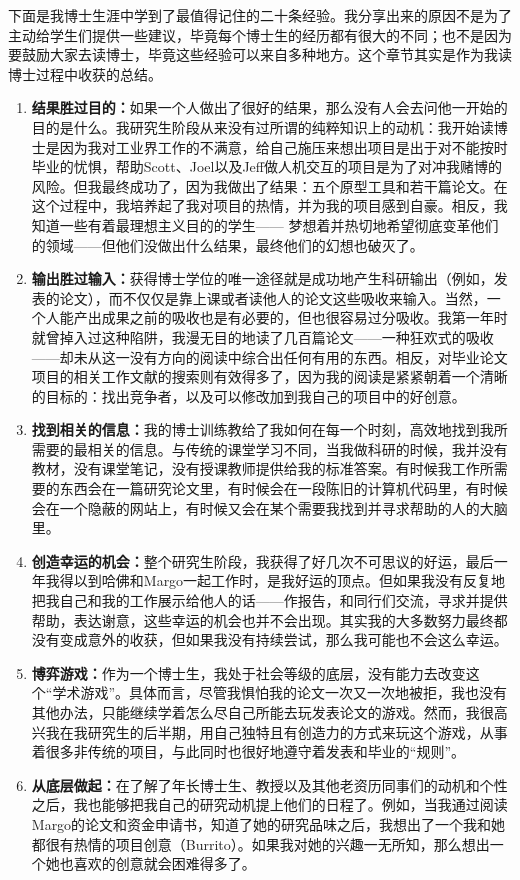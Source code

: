\documentclass[12pt,UTF8,nofonts]{book}
\begin{document}
下面是我博士生涯中学到了最值得记住的二十条经验。我分享出来的原因不是为了主动给学生们提供一些建议，毕竟每个博士生的经历都有很大的不同；也不是因为要鼓励大家去读博士，毕竟这些经验可以来自多种地方。这个章节其实是作为我读博士过程中收获的总结。
\begin{enumerate}
  \item \textbf{结果胜过目的：}如果一个人做出了很好的结果，那么没有人会去问他一开始的目的是什么。我研究生阶段从来没有过所谓的纯粹知识上的动机：我开始读博士是因为我对工业界工作的不满意，给自己施压来想出项目是出于对不能按时毕业的忧惧，帮助Scott、Joel以及Jeff做人机交互的项目是为了对冲我赌博的风险。但我最终成功了，因为我做出了结果：五个原型工具和若干篇论文。在这个过程中，我培养起了我对项目的热情，并为我的项目感到自豪。相反，我知道一些有着最理想主义目的的学生—— 梦想着并热切地希望彻底变革他们的领域——但他们没做出什么结果，最终他们的幻想也破灭了。
  \item \textbf{输出胜过输入：}获得博士学位的唯一途径就是成功地产生科研输出（例如，发表的论文），而不仅仅是靠上课或者读他人的论文这些吸收来输入。当然，一个人能产出成果之前的吸收也是有必要的，但也很容易过分吸收。我第一年时就曾掉入过这种陷阱，我漫无目的地读了几百篇论文——一种狂欢式的吸收——却未从这一没有方向的阅读中综合出任何有用的东西。相反，对毕业论文项目的相关工作文献的搜索则有效得多了，因为我的阅读是紧紧朝着一个清晰的目标的：找出竞争者，以及可以修改加到我自己的项目中的好创意。
  \item \textbf{找到相关的信息：}我的博士训练教给了我如何在每一个时刻，高效地找到我所需要的最相关的信息。与传统的课堂学习不同，当我做科研的时候，我并没有教材，没有课堂笔记，没有授课教师提供给我的标准答案。有时候我工作所需要的东西会在一篇研究论文里，有时候会在一段陈旧的计算机代码里，有时候会在一个隐蔽的网站上，有时候又会在某个需要我找到并寻求帮助的人的大脑里。
  \item \textbf{创造幸运的机会：}整个研究生阶段，我获得了好几次不可思议的好运，最后一年我得以到哈佛和Margo一起工作时，是我好运的顶点。但如果我没有反复地把我自己和我的工作展示给他人的话——作报告，和同行们交流，寻求并提供帮助，表达谢意，这些幸运的机会也并不会出现。其实我的大多数努力最终都没有变成意外的收获，但如果我没有持续尝试，那么我可能也不会这么幸运。
  \item \textbf{博弈游戏：}作为一个博士生，我处于社会等级的底层，没有能力去改变这个“学术游戏”。具体而言，尽管我惧怕我的论文一次又一次地被拒，我也没有其他办法，只能继续学着怎么尽自己所能去玩发表论文的游戏。然而，我很高兴我在我研究生的后半期，用自己独特且有创造力的方式来玩这个游戏，从事着很多非传统的项目，与此同时也很好地遵守着发表和毕业的“规则”。
  \item \textbf{从底层做起：}在了解了年长博士生、教授以及其他老资历同事们的动机和个性之后，我也能够把我自己的研究动机提上他们的日程了。例如，当我通过阅读Margo的论文和资金申请书，知道了她的研究品味之后，我想出了一个我和她都很有热情的项目创意（Burrito）。如果我对她的兴趣一无所知，那么想出一个她也喜欢的创意就会困难得多了。

\end{enumerate}
\end{document}
